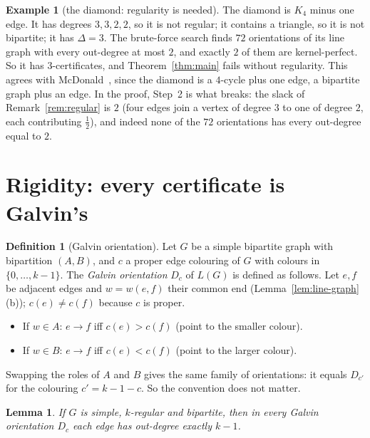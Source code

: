 \documentclass[11pt]{article}
\theoremstyle{plain}
\newtheorem{lemma}[theorem]{Lemma}
\theoremstyle{definition}
\newtheorem{definition}[theorem]{Definition}
\newtheorem{example}[theorem]{Example}
\theoremstyle{remark}
\newcommand{\LG}{L(G)}
\begin{document}
\begin{example}[the diamond: regularity is needed]\label{ex:diamond}
The diamond is $K_4$ minus one edge. It has degrees $3,3,2,2$, so it is not regular; it contains
a triangle, so it is not bipartite; it has $\Delta=3$. The brute-force search finds $72$
orientations of its line graph with every out-degree at most $2$, and exactly $2$ of them are
kernel-perfect. So it has $3$-certificates, and Theorem~\ref{thm:main} fails without regularity.
This agrees with McDonald~\cite[Theorem~3]{mcd}, since the diamond is a $4$-cycle plus one edge,
a bipartite graph plus an edge.
In the proof, Step~2 is what breaks: the slack of Remark~\ref{rem:regular} is $2$ (four edges
join a vertex of degree $3$ to one of degree $2$, each contributing $\tfrac12$), and indeed none
of the $72$ orientations has every out-degree equal to $2$.
\end{example}

\section{Rigidity: every certificate is Galvin's}\label{sec:rigidity}

\begin{definition}[Galvin orientation]\label{def:galvin-orientation}
Let $G$ be a simple bipartite graph with bipartition $(A,B)$, and $c$ a proper edge colouring of
$G$ with colours in $\{0,\dots,k-1\}$. The \emph{Galvin orientation} $D_c$ of $\LG$ is defined
as follows. Let $e,f$ be adjacent edges and $w=w(e,f)$ their common end
(Lemma~\ref{lem:line-graph}(b)); $c(e)\ne c(f)$ because $c$ is proper.
\begin{itemize}
  \item If $w\in A$: $e\to f$ iff $c(e)>c(f)$ (point to the smaller colour).
  \item If $w\in B$: $e\to f$ iff $c(e)<c(f)$ (point to the larger colour).
\end{itemize}
\end{definition}

Swapping the roles of $A$ and $B$ gives the same family of orientations: it equals $D_{c'}$ for
the colouring $c'=k-1-c$. So the convention does not matter.

\begin{lemma}\label{lem:galvin-outdeg}
If $G$ is simple, $k$-regular and bipartite, then in every Galvin orientation $D_c$ each edge has
out-degree exactly $k-1$.
\end{lemma}
\end{document}
